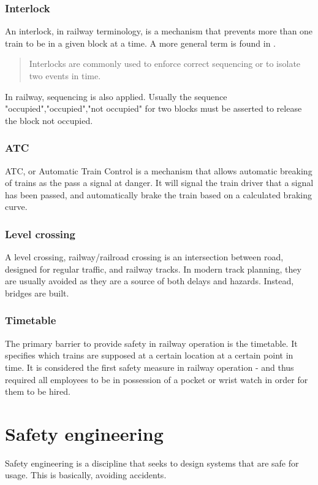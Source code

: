 \documentclass[10pt,oneside]{book}                  %
\begin{document}
\subsubsection{Interlock}
An interlock, in railway terminology, is a mechanism that prevents more than one train to be in a given block at a time. A more general term is found in \cite{leveson1995safeware}.
\begin{quote}
Interlocks are commonly used to enforce correct sequencing or to isolate two events in time.
\end{quote}
In railway, sequencing is also applied. Usually the sequence "occupied","occupied","not occupied" for two blocks must be asserted to release the block not occupied.
\subsubsection{ATC}
\label{sec:atc}
ATC, or Automatic Train Control is a mechanism that allows automatic breaking of trains as the pass a signal at danger. It will signal the train driver that a signal has been passed, and automatically brake the train based on a calculated braking curve.

\subsubsection{Level crossing}
A level crossing, railway/railroad crossing is an intersection between road, designed for regular traffic, and railway tracks. In modern track planning, they are usually avoided as they are a source of both delays and hazards. Instead, bridges are built.

\subsubsection{Timetable}
The primary barrier to provide safety in railway operation is the timetable. It specifies which trains are supposed at a certain location at a certain point in time. It is considered the first safety measure in railway operation - and thus required all employees to be in possession of a pocket or wrist watch in order for them to be hired.

\section{Safety engineering}
Safety engineering is a discipline that seeks to design systems that are safe for usage. This is basically, avoiding accidents.
\end{document}
